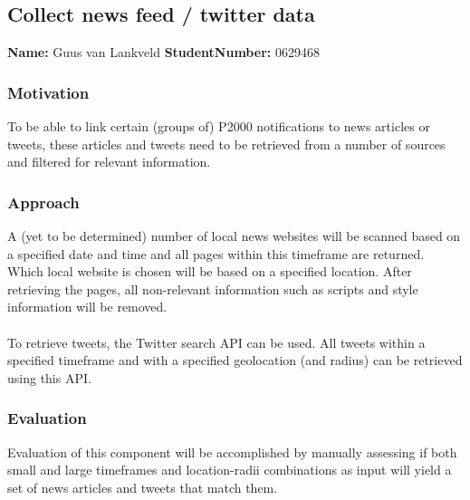 \subsection*{Collect news feed /  twitter data}
\textbf{Name:} Guus van Lankveld \indent \textbf{StudentNumber:} 0629468

\subsubsection*{Motivation}
To be able to link certain (groups of) P2000 notifications to news articles or tweets, these articles and tweets need to be retrieved from a number of sources and filtered for relevant information.

\subsubsection*{Approach}
A (yet to be determined) number of local news websites will be scanned based on a specified date and time and all pages within this timeframe are returned. Which local website is chosen will be based on a specified location. After retrieving the pages, all non-relevant information such as scripts and style information will be removed.\\\\
To retrieve tweets, the Twitter search API can be used. All tweets within a specified timeframe and with a specified geolocation (and radius) can be retrieved using this API.

\subsubsection*{Evaluation }
Evaluation of this component will be accomplished by manually assessing if both small and large timeframes and location-radii combinations as input will yield a set of news articles and tweets that match them.
